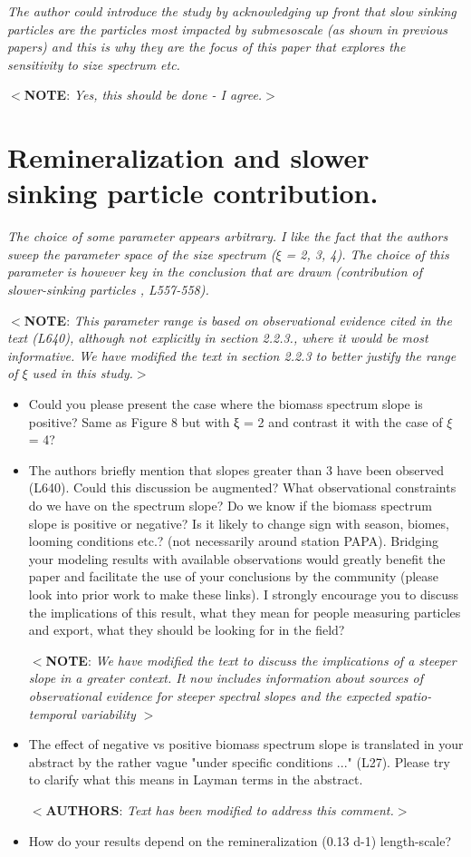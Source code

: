 \documentclass[12pt,letter]{article}
\newcommand{\note}[1]{\color{red}$<$\textbf{NOTE}: \textit{#1}$>$\color{black}}
\newcommand{\rep}[1]{\color{blue}$<$\textbf{AUTHORS}: \textit{#1}$>$\color{black}\\}
\begin{document}
\textit{The author could introduce the study by acknowledging up front that slow sinking particles are the particles most impacted by submesoscale (as shown in previous papers) and this is why they are the focus of this paper that explores the sensitivity to size spectrum etc.\\}

\note{Yes, this should be done - I agree.}


\section*{Remineralization and slower sinking particle contribution.}
\textit{The choice of some parameter appears arbitrary. I like the fact that the authors sweep the parameter space of the size spectrum ($\xi$ = 2, 3, 4). The choice of this parameter is however key in the conclusion that are drawn (contribution of slower-sinking particles , L557-558).\\}

\note{This parameter range is based on observational evidence cited in the text (L640), although not explicitly in section 2.2.3., where it would be most informative. We have modified the text in section 2.2.3 to better justify the range of $\xi$ used in this study.}


\begin{itemize}
	\item Could you please present the case where the biomass spectrum slope is positive? Same as Figure 8 but with ξ = 2 and contrast it with the case of $\xi$ = 4?
	
	\item The authors briefly mention that slopes greater than 3 have been observed (L640). Could this discussion be augmented? What observational constraints do we have on the spectrum slope? Do we know if the biomass spectrum slope is positive or negative? Is it likely to change sign with season, biomes, looming conditions etc.? (not necessarily around station PAPA). Bridging your modeling results with available observations would greatly benefit the paper and facilitate the use of your conclusions by the community (please look into prior work to make these links). I strongly encourage you to discuss the implications of this result, what they mean for people measuring particles and export, what they should be looking for in the field?
	
	\note{We have modified the text to discuss the implications of a steeper slope in a greater context. It now includes information about sources of observational evidence for steeper spectral slopes and the expected spatio-temporal variability }
	
	\item The effect of negative vs positive biomass spectrum slope is translated in your abstract by the rather vague "under specific conditions ..." (L27). Please try to clarify what this means in Layman terms in the abstract.
	
	\rep{Text has been modified to address this comment.}
	
	\item How do your results depend on the remineralization (0.13 d-1) length-scale? 
\end{itemize}
\end{document}
